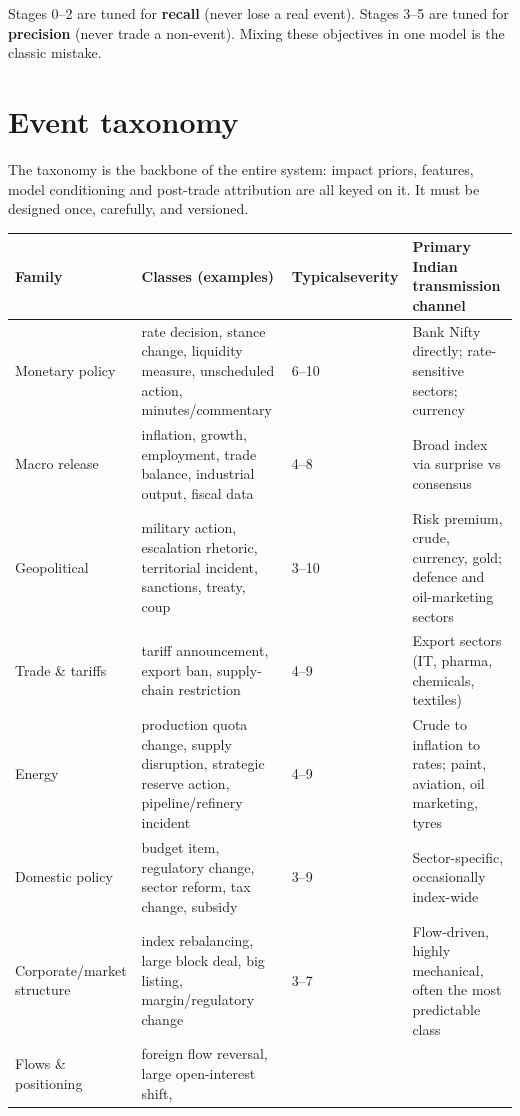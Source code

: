 \begin{keybox}[title={Asymmetric error policy}]
Stages 0--2 are tuned for \textbf{recall} (never lose a real event). Stages 3--5
are tuned for \textbf{precision} (never trade a non-event). Mixing these
objectives in one model is the classic mistake.
\end{keybox}

\section{Event taxonomy}

The taxonomy is the backbone of the entire system: impact priors, features,
model conditioning and post-trade attribution are all keyed on it. It must be
designed once, carefully, and versioned.

\begin{longtable}{@{}p{3.3cm}p{4.4cm}p{2.1cm}p{4.4cm}@{}}
\toprule
\textbf{Family} & \textbf{Classes (examples)} & \textbf{Typical\newline severity}
& \textbf{Primary Indian transmission channel}\\
\midrule
\endhead
Monetary policy & rate decision, stance change, liquidity measure, unscheduled
action, minutes/commentary & 6--10 & Bank Nifty directly; rate-sensitive
sectors; currency\\
Macro release & inflation, growth, employment, trade balance, industrial output,
fiscal data & 4--8 & Broad index via surprise vs consensus\\
Geopolitical & military action, escalation rhetoric, territorial incident,
sanctions, treaty, coup & 3--10 & Risk premium, crude, currency, gold; defence
and oil-marketing sectors\\
Trade \& tariffs & tariff announcement, export ban, supply-chain restriction &
4--9 & Export sectors (IT, pharma, chemicals, textiles)\\
Energy & production quota change, supply disruption, strategic reserve action,
pipeline/refinery incident & 4--9 & Crude to inflation to rates; paint,
aviation, oil marketing, tyres\\
Domestic policy & budget item, regulatory change, sector reform, tax change,
subsidy & 3--9 & Sector-specific, occasionally index-wide\\
Corporate/market structure & index rebalancing, large block deal, big listing,
margin/regulatory change & 3--7 & Flow-driven, highly mechanical, often the most
predictable class\\
Flows \& positioning & foreign flow reversal, large open-interest shift,

\end{longtable}

